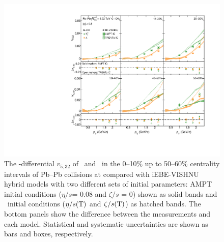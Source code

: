  \begin{figure}[h]
\begin{center}
\includegraphics[scale=0.73]{figures/model/TrentoAndAMPT_v523_gap00_LambdaK0s.pdf}
\end{center}
\caption{The \pT-differential $v_{5,32}$ of \Ks~and \lambdas~in the 0--10\% up to 50--60\% centrality intervals of Pb--Pb collisions at \sNN compared with iEBE-VISHNU hybrid models with two different sets of initial parameters: AMPT initial conditions ($\eta/s$= 0.08 and $\zeta/s$ = 0) shown as solid bands and \trento~initial conditions ($\eta/s({\rm T})$ and $\zeta/s({\rm T})$) as hatched bands. The bottom panels show the difference between the measurements and each model. Statistical and systematic uncertainties are shown as bars and boxes, respectively.}
\label{v523_model_KL}
\end{figure}


